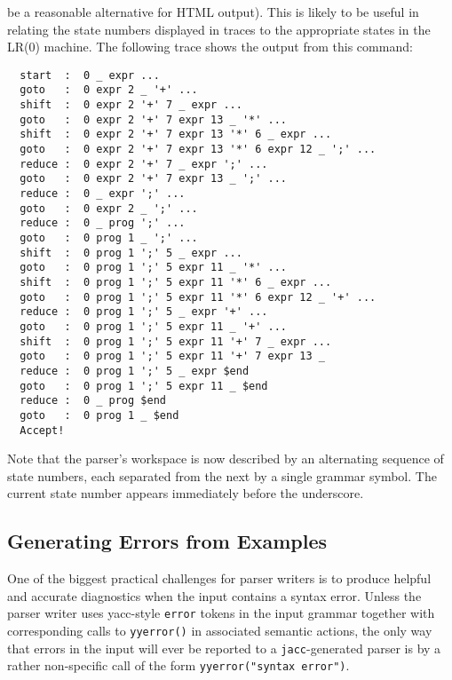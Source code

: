 \documentclass[12pt]{article}
\def\jacc{{\tt jacc}}
\begin{document}
be a reasonable alternative for HTML output).  This is likely to be
useful in relating the state numbers displayed in traces to the
appropriate states in the LR(0) machine.  The following trace shows
the output from this command:
{\small
\begin{verbatim}
  start  :  0 _ expr ...
  goto   :  0 expr 2 _ '+' ...
  shift  :  0 expr 2 '+' 7 _ expr ...
  goto   :  0 expr 2 '+' 7 expr 13 _ '*' ...
  shift  :  0 expr 2 '+' 7 expr 13 '*' 6 _ expr ...
  goto   :  0 expr 2 '+' 7 expr 13 '*' 6 expr 12 _ ';' ...
  reduce :  0 expr 2 '+' 7 _ expr ';' ...
  goto   :  0 expr 2 '+' 7 expr 13 _ ';' ...
  reduce :  0 _ expr ';' ...
  goto   :  0 expr 2 _ ';' ...
  reduce :  0 _ prog ';' ...
  goto   :  0 prog 1 _ ';' ...
  shift  :  0 prog 1 ';' 5 _ expr ...
  goto   :  0 prog 1 ';' 5 expr 11 _ '*' ...
  shift  :  0 prog 1 ';' 5 expr 11 '*' 6 _ expr ...
  goto   :  0 prog 1 ';' 5 expr 11 '*' 6 expr 12 _ '+' ...
  reduce :  0 prog 1 ';' 5 _ expr '+' ...
  goto   :  0 prog 1 ';' 5 expr 11 _ '+' ...
  shift  :  0 prog 1 ';' 5 expr 11 '+' 7 _ expr ...
  goto   :  0 prog 1 ';' 5 expr 11 '+' 7 expr 13 _
  reduce :  0 prog 1 ';' 5 _ expr $end
  goto   :  0 prog 1 ';' 5 expr 11 _ $end
  reduce :  0 _ prog $end
  goto   :  0 prog 1 _ $end
  Accept!
\end{verbatim}
}%
Note that the parser's workspace is now described by an alternating
sequence of state numbers, each separated from the next by a single
grammar symbol.  The current state number 
appears immediately before the underscore.

\subsection{Generating Errors from Examples}\label{sec-errs}
One of the biggest practical challenges for parser writers is to
produce helpful and accurate diagnostics when the input contains
a syntax error.  Unless the parser writer uses yacc-style \verb"error"
tokens in the input grammar together with corresponding calls to
\verb"yyerror()" in associated semantic actions, the only way that
errors in the input will ever be reported to a \jacc-generated parser
is by a rather non-specific call of the form \verb+yyerror("syntax error")+.
\end{document}
